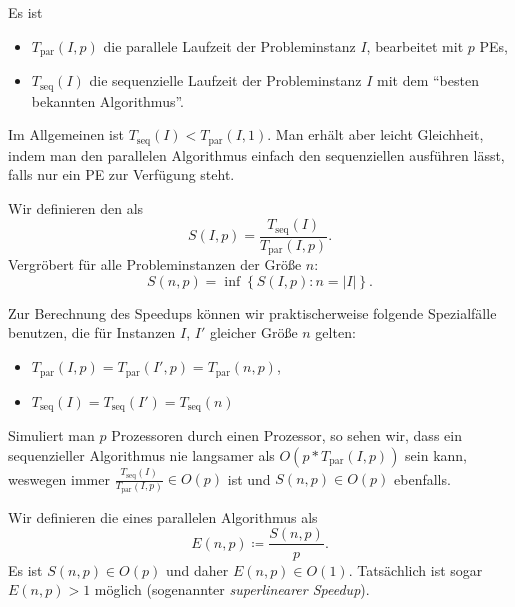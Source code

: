 Es ist
\begin{itemize}
  \item \( T_\text{par}(I,p) \) die parallele Laufzeit der Probleminstanz \( I \), bearbeitet mit \( p \) PEs,
  \item \( T_\text{seq}(I) \) die sequenzielle Laufzeit der Probleminstanz \( I \) mit dem ``besten bekannten Algorithmus''.
\end{itemize}

Im Allgemeinen ist \( T_\text{seq}(I) < T_\text{par}(I,1) \). Man erhält aber leicht Gleichheit, indem man den parallelen Algorithmus einfach den sequenziellen ausführen lässt, falls nur ein PE zur Verfügung steht.

\begin{definition}[Speedup]
  Wir definieren den  als
  \begin{equation*}
    S(I,p) = \frac{T_\text{seq}(I)}{T_\text{par}(I,p)}\text{.}
  \end{equation*}
  Vergröbert für alle Probleminstanzen der Größe \( n \):
  \begin{equation*}
    S(n,p) = \inf\left \{ S(I,p) : n = \left\vert I \right\vert \right \}\text{.}
  \end{equation*}
\end{definition}

Zur Berechnung des Speedups können wir praktischerweise folgende Spezialfälle benutzen, die für Instanzen \( I \), \( I' \) gleicher Größe \( n \) gelten:
\begin{itemize}
  \item \( T_\text{par}(I,p) = T_\text{par}(I',p) = T_\text{par}(n,p) \),
  \item \( T_\text{seq}(I) = T_\text{seq}(I') = T_\text{seq}(n) \)
\end{itemize}

Simuliert man \( p \) Prozessoren durch einen Prozessor, so sehen wir, dass ein sequenzieller Algorithmus nie langsamer als \( O(p*T_\text{par}(I,p)) \) sein kann, weswegen immer \( \frac{T_\text{seq}(I)}{T_\text{par}(I,p)} \in O(p) \) ist und \( S(n,p) \in O(p) \) ebenfalls.

\begin{definition}[Effizienz]
  Wir definieren die  eines parallelen Algorithmus als
  \begin{equation*}
    E(n,p) \coloneqq \frac{S(n,p)}{p}\text{.}
  \end{equation*}
  Es ist \( S(n,p) \in O(p) \) und daher \( E(n,p) \in O(1) \). Tatsächlich ist sogar \( E(n,p) > 1 \) möglich (sogenannter \emph{superlinearer Speedup}).
\end{definition}

